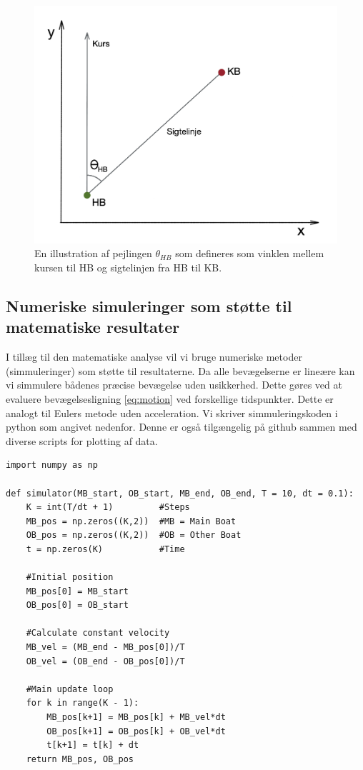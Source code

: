 \documentclass[%
 reprint,
nofootinbib,
aps,
]{revtex4-1}
\begin{document}
\begin{figure}[H]
  \includegraphics[width=\linewidth]{figures/metode_tegning.png}
  \caption{En illustration af pejlingen $\theta_{HB}$ som defineres som vinklen mellem kursen til HB og sigtelinjen fra HB til KB.  }
  \label{fig:metode_tegning}
\end{figure}

\subsection{Numeriske simuleringer som støtte til matematiske resultater}\label{sec:numerical_method}
I tillæg til den matematiske analyse vil vi bruge numeriske metoder (simmuleringer) som støtte til resultaterne. Da alle bevægelserne er lineære kan vi simmulere bådenes præcise bevægelse uden usikkerhed. Dette gøres ved at evaluere bevægelsesligning \ref{eq:motion} ved forskellige tidspunkter. Dette er analogt til Eulers metode uden acceleration. Vi skriver simmuleringskoden i python som angivet nedenfor. Denne er også tilgængelig på github \cite{github} sammen med diverse scripts for plotting af data.

\begin{verbatim}
import numpy as np

def simulator(MB_start, OB_start, MB_end, OB_end, T = 10, dt = 0.1):
    K = int(T/dt + 1)         #Steps
    MB_pos = np.zeros((K,2))  #MB = Main Boat
    OB_pos = np.zeros((K,2))  #OB = Other Boat
    t = np.zeros(K)           #Time

    #Initial position
    MB_pos[0] = MB_start
    OB_pos[0] = OB_start

    #Calculate constant velocity
    MB_vel = (MB_end - MB_pos[0])/T
    OB_vel = (OB_end - OB_pos[0])/T

    #Main update loop
    for k in range(K - 1):
        MB_pos[k+1] = MB_pos[k] + MB_vel*dt
        OB_pos[k+1] = OB_pos[k] + OB_vel*dt
        t[k+1] = t[k] + dt
    return MB_pos, OB_pos
\end{verbatim}
\end{document}
